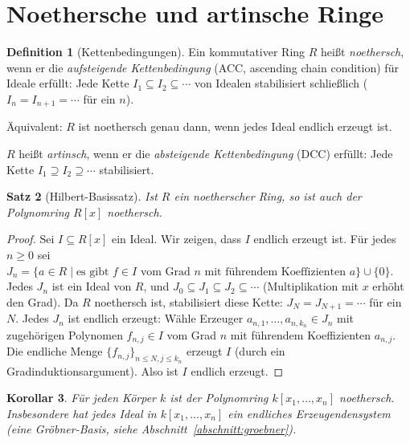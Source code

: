 \documentclass[12pt,a4paper]{amsart}
\newtheorem{theorem}{Satz}[section]
\newtheorem{corollary}[theorem]{Korollar}
\theoremstyle{definition}
\newtheorem{definition}[theorem]{Definition}
\theoremstyle{definition}
\begin{document}
\section{Noethersche und artinsche Ringe}

\begin{definition}[Kettenbedingungen]
Ein kommutativer Ring $R$ heißt \emph{noethersch}, wenn er die \emph{aufsteigende
Kettenbedingung} (ACC, ascending chain condition) für Ideale erfüllt: Jede Kette
$I_1 \subseteq I_2 \subseteq \cdots$ von Idealen stabilisiert schließlich
($I_n = I_{n+1} = \cdots$ für ein $n$).

Äquivalent: $R$ ist noethersch genau dann, wenn jedes Ideal endlich erzeugt ist.

$R$ heißt \emph{artinsch}, wenn er die \emph{absteigende Kettenbedingung} (DCC)
erfüllt: Jede Kette $I_1 \supseteq I_2 \supseteq \cdots$ stabilisiert.
\end{definition}

\begin{theorem}[Hilbert-Basissatz]\label{satz:hilbert-basis}
Ist $R$ ein noetherscher Ring, so ist auch der Polynomring $R[x]$ noethersch.
\end{theorem}

\begin{proof}
Sei $I \subseteq R[x]$ ein Ideal. Wir zeigen, dass $I$ endlich erzeugt ist.
Für jedes $n \geq 0$ sei $J_n = \{a \in R \mid \text{es gibt } f \in I \text{ vom Grad } n
\text{ mit führendem Koeffizienten } a\} \cup \{0\}$.
Jedes $J_n$ ist ein Ideal von $R$, und $J_0 \subseteq J_1 \subseteq J_2 \subseteq \cdots$
(Multiplikation mit $x$ erhöht den Grad). Da $R$ noethersch ist, stabilisiert diese Kette:
$J_N = J_{N+1} = \cdots$ für ein $N$. Jedes $J_n$ ist endlich erzeugt: Wähle Erzeuger
$a_{n,1},\ldots,a_{n,k_n} \in J_n$ mit zugehörigen Polynomen $f_{n,j} \in I$ vom Grad $n$
mit führendem Koeffizienten $a_{n,j}$. Die endliche Menge $\{f_{n,j}\}_{n \leq N, j \leq k_n}$
erzeugt $I$ (durch ein Gradinduk{}tionsargument). Also ist $I$ endlich erzeugt.
\end{proof}

\begin{corollary}
Für jeden Körper $k$ ist der Polynomring $k[x_1,\ldots,x_n]$ noethersch.
Insbesondere hat jedes Ideal in $k[x_1,\ldots,x_n]$ ein endliches Erzeugendensystem
(eine \emph{Gröbner-Basis}, siehe Abschnitt~\ref{abschnitt:groebner}).
\end{corollary}
\end{document}
